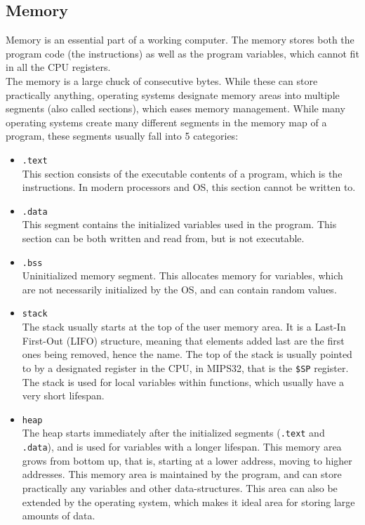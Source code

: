 \subsection{Memory}
Memory is an essential part of a working computer. The memory stores both the
program code (the instructions) as well as the program variables, which cannot
fit in all the CPU registers.\\
The memory is a large chuck of consecutive bytes. While these can store
practically anything, operating systems designate memory areas into multiple
segments (also called sections), which eases memory management.
While many operating systems create many different segments in the memory map
of a program, these segments usually fall into 5
categories\cite{memory_sections}\cite{COD5}\cite{see_mips_run}:
\begin{itemize}
\item \texttt{.text}\\
This section consists of the executable contents of a program, which is the
instructions. In modern processors and OS, this section cannot be written to.
\item \texttt{.data}\\
This segment contains the initialized variables used in the program. This section
can be both written and read from, but is not executable.
\item \texttt{.bss}\\
Uninitialized memory segment. This allocates memory for variables, which are not
necessarily initialized by the OS, and can contain random values.

\item \texttt{stack}\\
The stack usually starts at the top of the user memory area.
It is a Last-In First-Out (LIFO) structure, meaning that elements added last are
the first ones being removed, hence the name.
The top of the stack is usually pointed to by a designated register in the CPU, in MIPS32, that is
the \texttt{\$SP} register. The stack is used for local variables within
functions, which usually have a very short lifespan.

\item \texttt{heap}\\
The heap starts immediately after the initialized segments (\texttt{.text} and
\texttt{.data}), and is used for variables with a longer lifespan. This memory
area grows from bottom up, that is, starting at a lower address, moving to
higher addresses.
This memory area is maintained by the program, and can store practically any variables and
other data-structures. This area can also be extended by the operating system,
which makes it ideal area for storing large amounts of data.
\end{itemize}

